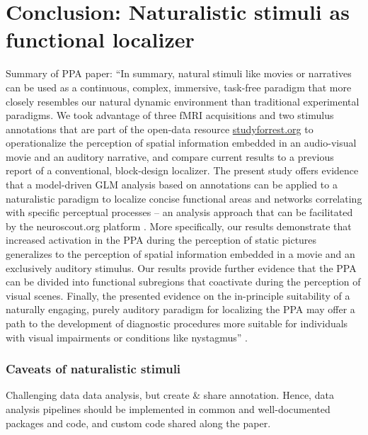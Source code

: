 \section{Conclusion: Naturalistic stimuli as functional localizer}

Summary of PPA paper:
``In summary, natural stimuli like movies \citep{eickhoff2020towards,
hasson2008neurocinematics, sonkusare2019naturalistic} or narratives
\citep{hamilton2018revolution, honey2012not, lerner2011topographic,
silbert2014coupled, wilson2008beyond} can be used as a continuous, complex,
immersive, task-free paradigm that more closely resembles our natural dynamic
environment than traditional experimental paradigms.
We took advantage of three fMRI acquisitions and two stimulus annotations that
are part of the open-data resource
\href{http://www.studyforrest.org}{studyforrest.org} to operationalize the
perception of spatial information embedded in an audio-visual movie and an
auditory narrative, and compare current results to a previous report of a
conventional, block-design localizer.
The present study offers evidence that a model-driven GLM analysis based on
annotations can be applied to a naturalistic paradigm to localize concise
functional areas and networks correlating with specific perceptual processes --
an analysis approach that can be facilitated by the neuroscout.org platform
\citep{delavega2021neuroscout}.
More specifically, our results demonstrate that increased activation in the PPA
during the perception of static pictures generalizes to the perception of
spatial information embedded in a movie and an exclusively auditory stimulus.
Our results provide further evidence that the PPA can be divided into functional
subregions that coactivate during the perception of visual scenes.
Finally, the presented evidence on the in-principle suitability of a naturally
engaging, purely auditory paradigm for localizing the PPA may offer a path to
the development of diagnostic procedures more suitable for individuals with
visual impairments or conditions like nystagmus''
\citep{haeusler2022processing}.


\subsubsection{Caveats of naturalistic stimuli}
%
Challenging data data analysis, but create \& share annotation.
%
Hence, data analysis pipelines should be implemented in common and
well-documented packages and code, and custom code shared along the paper.

